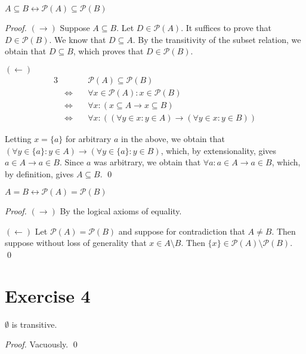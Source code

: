 \documentclass[11pt]{llncs}
\begin{document}
\begin{lemma}\label{lem.powerset-subset}
  $A \subseteq B \leftrightarrow \mathcal{P}(A) \subseteq \mathcal{P}(B)$
\end{lemma}
\begin{proof}
  \item $(\rightarrow)$
  Suppose $A \subseteq B$. Let $D \in \mathcal{P}(A)$. It suffices to prove that
  $D \in \mathcal{P}(B)$. We know that $D \subseteq A$. By the transitivity of
  the subset relation, we obtain that $D \subseteq B$, which proves that $D \in
  \mathcal{P}(B)$.

  \item $(\leftarrow)$
  \begin{alignat*}{3}
                         && \mathcal{P}(A) \subseteq \mathcal{P}(B)\\
    &\Leftrightarrow\quad & \forall x \in \mathcal{P}(A): x \in \mathcal{P}(B)\\
    &\Leftrightarrow\quad & \forall x: (x \subseteq A \rightarrow x \subseteq B)\\
    &\Leftrightarrow\quad & \forall x: ((\forall y \in x: y \in A) \rightarrow (\forall y \in x: y \in B))
  \end{alignat*}

  Letting $x = \{a\}$ for arbitrary $a$ in the above, we obtain that
  $(\forall y \in \{a\}: y \in A) \rightarrow (\forall y \in \{a\}: y \in B)$,
  which, by extensionality, gives
  $a \in A \rightarrow a \in B$. Since $a$ was arbitrary, we obtain that
  $\forall a: a \in A \rightarrow a \in B$, which, by definition, gives $A \subseteq B$.
  \qed
\end{proof}

\begin{lemma}
  $A = B \leftrightarrow \mathcal{P}(A) = \mathcal{P}(B)$
\end{lemma}
\begin{proof}
  \item $(\rightarrow)$ By the logical axioms of equality.
  \item $(\leftarrow)$ Let $\mathcal{P}(A) = \mathcal{P}(B)$ and suppose for
  contradiction that $A \neq B$. Then suppose without loss of generality that
  $x \in A \setminus B$.
  Then $\{x\} \in \mathcal{P}(A) \setminus \mathcal{P}(B)$.
  \qed
\end{proof}

\section*{Exercise 4}
\begin{lemma}
  $\emptyset$ is transitive.
\end{lemma}
\begin{proof}
  Vacuously. \qed
\end{proof}
\end{document}
